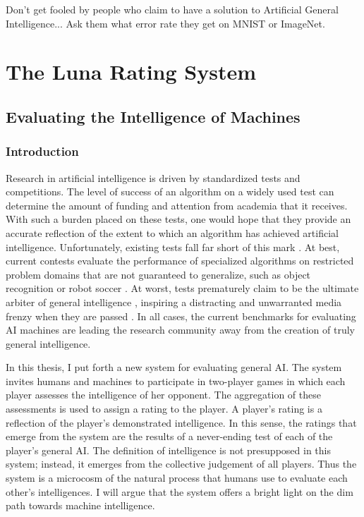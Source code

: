 \begin{savequote}[75mm]
Don't get fooled by people who claim to have a solution to Artificial General Intelligence... Ask them what error rate they get on MNIST or ImageNet.
\end{savequote}


\chapter{The Luna Rating System}

\section{Evaluating the Intelligence of Machines}

\subsection{Introduction}

Research in artificial intelligence is driven by standardized tests and competitions. The level of success of an algorithm on a widely used test can determine the amount of funding and attention from academia that it receives. With such a burden placed on these tests, one would hope that they provide an accurate reflection of the extent to which an algorithm has achieved artificial intelligence. Unfortunately, existing tests fall far short of this mark \cite{shieber15}. At best, current contests evaluate the performance of specialized algorithms on restricted problem domains that are not guaranteed to generalize, such as object recognition \cite{lecun98, russakovsky15} or robot soccer \cite{anderson11, kitano97}. At worst, tests prematurely claim to be the ultimate arbiter of general intelligence \cite{loebner03}, inspiring a distracting and unwarranted media frenzy when they are passed \cite{anonymous14, shieber14}. In all cases, the current benchmarks for evaluating AI machines are leading the research community away from the creation of truly general intelligence.

In this thesis, I put forth a new system for evaluating general AI. The system invites humans and machines to participate in two-player games in which each player assesses the intelligence of her opponent. The aggregation of these assessments is used to assign a rating to the player. A player's rating is a reflection of the player's demonstrated intelligence. In this sense, the ratings that emerge from the system are the results of a never-ending test of each of the player's general AI. The definition of intelligence is not presupposed in this system; instead, it emerges from the collective judgement of all players. Thus the system is a microcosm of the natural process that humans use to evaluate each other's intelligences. I will argue that the system offers a bright light on the dim path towards machine intelligence.

